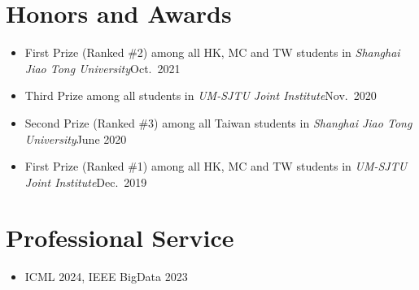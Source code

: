 \documentclass[letterpaper,10.8pt]{article}
\begin{document}
\section{Honors and Awards}
\begin{itemize}
      \item {}
            {First Prize (Ranked \#2) among all HK, MC and TW students in \emph{Shanghai Jiao Tong University}}{Oct.\ 2021}

      \item {}
            {Third Prize among all students in \emph{UM-SJTU Joint Institute}}{Nov.\ 2020}

      \item {}
            {Second Prize (Ranked \#3) among all Taiwan students in \emph{Shanghai Jiao Tong University}}{June 2020}

      \item {}
            {First Prize (Ranked \#1) among all HK, MC and TW students in \emph{UM-SJTU Joint Institute}}{Dec.\ 2019}
\end{itemize}

\section{Professional Service}
\begin{itemize}
      \item {}
            {ICML 2024, IEEE BigData 2023}{}
\end{itemize}
\end{document}
